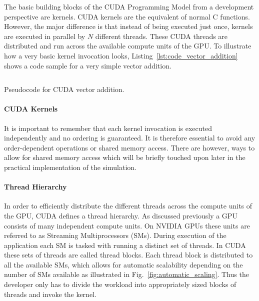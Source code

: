The basic building blocks of the CUDA Programming Model from a development perspective are kernels. CUDA kernels are the equivalent of normal C functions. However, the major difference is that instead of being executed just once, kernels are executed in parallel by $N$ different threads. These CUDA threads are distributed and run across the available compute units of the GPU. To illustrate how a very basic kernel invocation looks, Listing~\ref{lst:code_vector_addition} shows a code sample for a very simple vector addition.

\begin{listing}[!htbp]
  \centering
  \inputminted[mathescape,
    linenos,
    numbersep=5pt,
    fontsize=\footnotesize,
    frame=lines,
    framesep=2mm]{c}{lst/cuda_vector_add.lst}
  \caption{Pseudocode for CUDA vector addition.}
  \label{lst:code_vector_addition}
\end{listing}

\paragraph{CUDA Kernels}

It is important to remember that each kernel invocation is executed independently and no ordering is guaranteed. It is therefore essential to avoid any order-dependent operations or shared memory access. There are however, ways to allow for shared memory access which will be briefly touched upon later in the practical implementation of the simulation.

\paragraph{Thread Hierarchy}

In order to efficiently distribute the different threads across the compute units of the GPU, CUDA defines a thread hierarchy. As discussed previously a GPU consists of many independent compute units. On NVIDIA GPUs these units are referred to as Streaming Multiprocessors (SMs). During execution of the application each SM is tasked with running a distinct set of threads. In CUDA these sets of threads are called thread blocks. Each thread block is distributed to all the available SMs, which allows for automatic scalability depending on the number of SMs available  as illustrated in Fig.~\ref{fig:automatic_scaling}. Thus the developer only has to divide the workload into appropriately sized blocks of threads and invoke the kernel.

